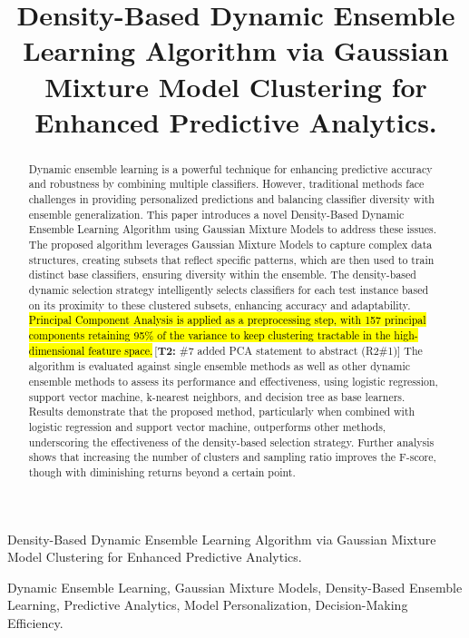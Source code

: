 \documentclass[lettersize,journal]{IEEEtran}
\newcommand{\tchange}[2]{\hl{#1}\,\textcolor{tier2note}{\footnotesize[\textbf{T2:} #2]}}
\begin{document}
	\title{Density-Based Dynamic Ensemble Learning Algorithm via Gaussian Mixture Model Clustering for Enhanced Predictive Analytics.}
	\author{}
	
	{Density-Based Dynamic Ensemble Learning Algorithm via Gaussian Mixture Model Clustering for Enhanced Predictive Analytics.}
	
	\maketitle
	\begin{abstract}
		 Dynamic ensemble learning is a powerful technique for enhancing predictive accuracy and robustness by combining multiple classifiers. However, traditional methods face challenges in providing personalized predictions and balancing classifier diversity with ensemble generalization.
		 This paper introduces a novel Density-Based Dynamic Ensemble Learning Algorithm using Gaussian Mixture Models to address these issues. The proposed algorithm leverages Gaussian Mixture Models to capture complex data structures, creating subsets that reflect specific patterns, which are then used to train distinct base classifiers, ensuring diversity within the ensemble. The density-based dynamic selection strategy intelligently selects classifiers for each test instance based on its proximity to these clustered subsets, enhancing accuracy and adaptability. \tchange{Principal Component Analysis is applied as a preprocessing step, with 157 principal components retaining 95\% of the variance to keep clustering tractable in the high-dimensional feature space.}{\#7 added PCA statement to abstract (R2\#1)} The algorithm is evaluated against single ensemble methods as well as other dynamic ensemble methods to assess its performance and effectiveness, using logistic regression, support vector machine, k-nearest neighbors, and decision tree as base learners. Results demonstrate that the proposed method, particularly when combined with logistic regression and support vector machine, outperforms other methods, underscoring the effectiveness of the density-based selection strategy. Further analysis shows that increasing the number of clusters and sampling ratio improves the F-score, though with diminishing returns beyond a certain point.
	\end{abstract}
	
	\begin{IEEEkeywords}
		Dynamic Ensemble Learning, Gaussian Mixture Models, Density-Based Ensemble Learning, Predictive Analytics, Model Personalization, Decision-Making Efficiency.
	\end{IEEEkeywords}
	
\end{document}
